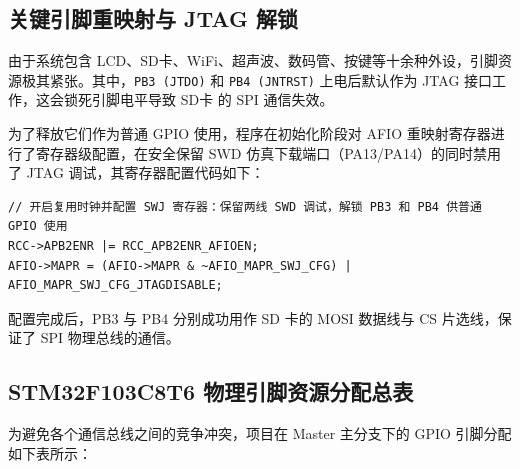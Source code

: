 \documentclass[11pt,a4paper]{ctexart}
\begin{document}
\subsection{关键引脚重映射与 JTAG 解锁}
由于系统包含 LCD、SD卡、WiFi、超声波、数码管、按键等十余种外设，引脚资源极其紧张。其中，\texttt{PB3 (JTDO)} 和 \texttt{PB4 (JNTRST)} 上电后默认作为 JTAG 接口工作，这会锁死引脚电平导致 SD卡 的 SPI 通信失效。

为了释放它们作为普通 GPIO 使用，程序在初始化阶段对 AFIO 重映射寄存器进行了寄存器级配置，在安全保留 SWD 仿真下载端口（PA13/PA14）的同时禁用了 JTAG 调试，其寄存器配置代码如下：
\begin{lstlisting}[style=cstyle]
// 开启复用时钟并配置 SWJ 寄存器：保留两线 SWD 调试，解锁 PB3 和 PB4 供普通 GPIO 使用
RCC->APB2ENR |= RCC_APB2ENR_AFIOEN;
AFIO->MAPR = (AFIO->MAPR & ~AFIO_MAPR_SWJ_CFG) | AFIO_MAPR_SWJ_CFG_JTAGDISABLE;
\end{lstlisting}
配置完成后，PB3 与 PB4 分别成功用作 SD 卡的 MOSI 数据线与 CS 片选线，保证了 SPI 物理总线的通信。

\subsection{STM32F103C8T6 物理引脚资源分配总表}
为避免各个通信总线之间的竞争冲突，项目在 Master 主分支下的 GPIO 引脚分配如下表所示：
\end{document}

